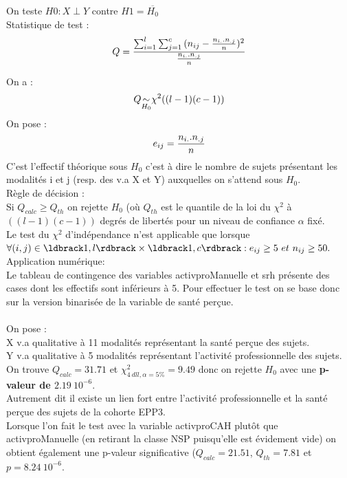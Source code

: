 \documentclass{book}
\begin{document}
\noindent
On teste $H0 : X \perp Y $ contre $H1 = \overline{H_0}$\\
\noindent
Statistique de test : 
\begin{equation}
Q = {\sum _{i = 1} ^l \sum_{j = 1} ^c {{(n_{ij} - {{n_{i.}.n_{.j}}\over{n}})^2}} \over {{n_{i.}.n_{.j}}\over{n}}}
\end{equation}

\noindent
On a : \\
\begin{equation}
Q \underset {\small{H_0}}{\large{\sim}} \chi ^{2} ((l-1)(c-1))
\end{equation}
\noindent
On pose :\\
\begin{equation}
e_{ij} = { {n_{i.}.n_ {.j} } \over {n} }
\end{equation}
C'est l'effectif théorique sous $H_0$ c'est à dire le nombre de sujets présentant les modalités i et j (resp. des v.a X et Y) auxquelles on s'attend sous $H_0$.\\

\noindent
Règle de décision :\\
Si $Q_{calc} \geq Q_{th}$ on rejette $H_0$ (où $Q_{th}$ est le quantile de la loi du $\chi ^2$ à $((l-1)(c-1))$ degrés de libertés pour un niveau de confiance $\alpha$ fixé.\\

\noindent
Le test du $\chi ^2$ d'indépendance n'est applicable que lorsque $\forall (i,j) \in \ldbrack 1,l \rdbrack \times \ldbrack 1,c \rdbrack : e_{ij} \geq 5 ~et ~n_{ij} \geq 50.$\\
\noindent
Application numérique:\\
Le tableau de contingence des variables activproManuelle et srh présente des cases dont les effectifs sont inférieurs à 5. Pour effectuer le test on se base donc sur la version binarisée de la variable de santé perçue.\\\\
\noindent
On pose :\\
\noindent
X v.a qualitative à 11 modalités représentant la santé perçue des sujets.\\
\noindent
Y v.a qualitative à 5 modalités représentant l'activité professionnelle des sujets.\\

\noindent
On trouve $Q_{calc} = 31.71$ et $\chi ^2 _ {4 ~dll, \alpha = 5 \%} = 9.49$ donc on rejette $H_0$ avec une \textbf{p-valeur de $2.19 ~10^{-6}$}.\\
Autrement dit il existe un lien fort entre l'activité professionnelle et la santé perçue des sujets de la cohorte EPP3.\\
\noindent
Lorsque l'on fait le test avec la variable activproCAH plutôt que activproManuelle (en retirant la classe NSP puisqu'elle est évidement vide) on obtient également une p-valeur significative ($Q_{calc} = 21.51$, $Q_{th} = 7.81$ et $p= 8.24 ~10^{-6}$.
\end{document}
